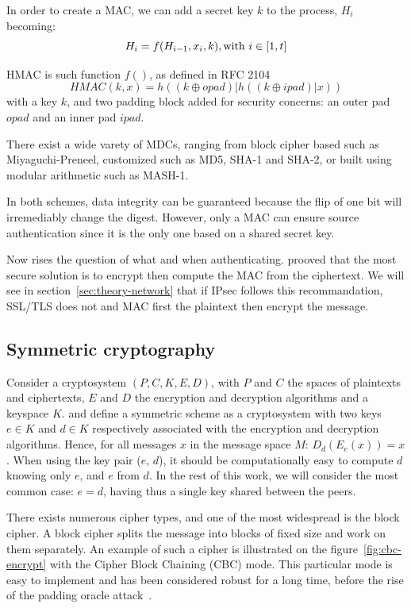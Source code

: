 In order to create a MAC, we can add a secret key $k$ to the process, $H_i$ becoming:
\[
	H_i = f(H_{i-1}, x_i, k), \mbox{with } i \in [1,t]\\
\]

HMAC is such function $f()$, as defined in RFC 2104~\cite{rfc2104}
\[
	HMAC(k, x) = h((k\oplus opad)|h((k\oplus ipad)|x))
\]
with a key $k$, and two padding block added for security concerns: an outer pad $opad$ and an inner pad $ipad$.

\noindent There exist a wide varety of MDCs, ranging from block cipher based such as Miyaguchi-Preneel, customized such as MD5, SHA-1 and SHA-2, or built using modular arithmetic such as MASH-1.

In both schemes, data integrity can be guaranteed because the flip of one bit will irremediably change the digest.
However, only a MAC can ensure source authentication since it is the only one based on a shared secret key.

Now rises the question of what and when authenticating.
\citet{Bellare2000} prooved that the most secure solution is to encrypt then compute the MAC from the ciphertext.
We will see in section~\ref{sec:theory-network} that if IPsec follows this recommandation, SSL/TLS does not and MAC first the plaintext then encrypt the message.











\subsection{Symmetric cryptography}\label{sec:symmetric}
Consider a cryptosystem $(P,C,K,E,D)$, with $P$ and $C$ the spaces of plaintexts and ciphertexts, $E$ and $D$ the encryption and decryption algorithms and a keyspace $K$.
\citet{Menezes1996} and \citet{infof405} define a symmetric scheme as a cryptosystem with two keys $e \in K$ and $d \in K$ respectively associated with the encryption and decryption algorithms.
Hence, for all messages $x$ in the message space $M$: $D_d(E_e(x)) = x$.
When using the key pair ($e$, $d$), it should be computationally easy to compute $d$ knowing only $e$, and $e$ from $d$.
In the rest of this work, we will consider the most common case: $e = d$, having thus a single key shared between the peers.

There exists numerous cipher types, and one of the most widespread is the block cipher.
A block cipher splits the message into blocks of fixed size and work on them separately.
An example of such a cipher is illustrated on the figure~\ref{fig:cbc-encrypt} with the Cipher Block Chaining (CBC) mode.
This particular mode is easy to implement and has been considered robust for a long time, before the rise of the padding oracle attack~\cite{vaudenay2002}.

